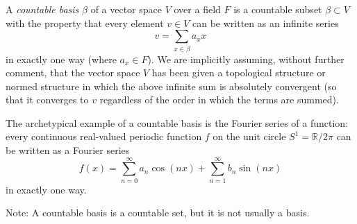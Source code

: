 \documentclass[12pt]{article}
\begin{document}
A {\em countable basis} $\beta$ of a vector space $V$ over a field $F$ is a countable subset $\beta \subset V$ with the property that every element $v \in V$ can be written as an infinite series
$$
v = \sum_{x \in \beta} a_x x
$$
in exactly one way (where $a_x \in F$). We are implicitly assuming, without further comment, that the vector space $V$ has been given a topological structure or normed structure in which the above infinite sum is absolutely convergent (so that it converges to $v$ regardless of the order in which the terms are summed).

The archetypical example of a countable basis is the Fourier series of a function: every continuous real-valued periodic function $f$ on the unit circle $S^1 = \mathbb{R}/2\pi$ can be written as a Fourier series
$$
f(x) = \sum_{n=0}^\infty a_n \cos(n x) + \sum_{n=1}^\infty b_n \sin(n x)
$$
in exactly one way.

Note: A countable basis is a countable set, but it is not usually a basis.
\end{document}
